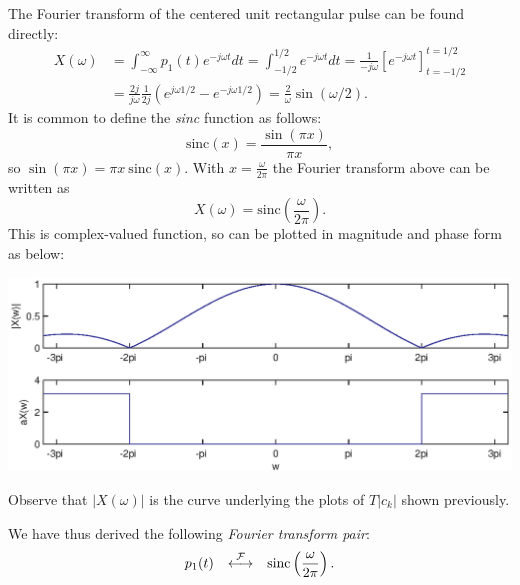\documentclass[10pt]{beamer}
\newcommand{\ftpair}{{\stackrel{\cal F}{\longleftrightarrow}}}
\begin{document}
The Fourier transform of the centered unit rectangular pulse can be found directly:
\begin{align*}
  X(\omega) &= \int_{-\infty}^{\infty} p_1(t) e^{-j \omega t} dt 
  = \int_{-1/2}^{1/2} e^{-j \omega t} dt 
  = \frac{1}{-j \omega} \left[ e^{-j \omega t} \right]_{t=-1/2}^{t=1/2} \\
  &= \frac{2j}{j \omega} \frac{1}{2j} (e^{j \omega 1/2} - e^{-j \omega 1/2})
  = \frac{2}{\omega} \sin (\omega/2).
\end{align*}
It is common to define the {\em sinc} function as follows:
\begin{equation*}
  \text{sinc}(x) = \frac{\sin(\pi x)}{\pi x},
\end{equation*}
so $\sin(\pi x) = \pi x \: \text{sinc}(x)$.  With $x = \frac{\omega}{2 \pi}$ the Fourier transform above can be written as
\begin{equation*}
  X(\omega) = \text{sinc} \left( \frac{\omega}{2 \pi} \right).
\end{equation*}
This is complex-valued function, so can be plotted in magnitude and phase form as below:
\begin{center}
  \includegraphics{fs2ft3}
\end{center}
Observe that $|X(\omega)|$ is the curve underlying the plots of $T |c_k|$ shown previously.

We have thus derived the following {\em Fourier transform pair}:
\begin{equation*}
  p_1(t) \quad \ftpair \quad \text{sinc} \left( \frac{\omega}{2 \pi} \right).
\end{equation*}
\end{document}
